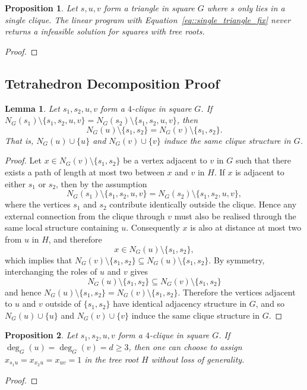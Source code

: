 \documentclass[11pt]{article}
\newtheorem{proposition}{Proposition}
\newtheorem{lemma}{Lemma}
\begin{document}
\begin{proposition} \label{prop::single_triangular_decomposition_feasibility}
  Let $s,u,v$ form a triangle in square $G$ where $s$ only lies in a single clique. The linear program with Equation~\eqref{eq::single_triangle_fix} never returns a infeasible solution for squares with tree roots. 
\end{proposition}
\begin{proof}
\end{proof}

\subsection{Tetrahedron Decomposition Proof} \label{subsec::TD_proof}
\begin{lemma} \label{lemma::tetrahedron_subset_neighbourhood}
  Let $s_1,s_2,u,v$ form a $4$-clique in square $G$. If $N_G(s_1)\setminus\{s_1,s_2,u,v\}=N_G(s_2)\setminus\{s_1,s_2,u,v\}$, then
  \[
  N_G(u)\setminus\{s_1, s_2\}=N_G(v)\setminus\{s_1, s_2\}.
  \]
  That is, $N_G(u)\cup\{u\}$ and $N_G(v)\cup\{v\}$ induce the same clique structure in $G$.
\end{lemma}
\begin{proof}
  Let $x \in N_G(v)\setminus\{s_1,s_2\}$ be a vertex adjacent to $v$ in $G$ such that there exists a path of length at most two between $x$ and $v$ in $H$. If $x$ is adjacent to either $s_1$ or $s_2$, then by the assumption
  \[
  N_G(s_1)\setminus\{s_1,s_2,u,v\}
  =
  N_G(s_2)\setminus\{s_1,s_2,u,v\},
  \]
  where the vertices $s_1$ and $s_2$ contribute identically outside the clique. Hence any external connection from the clique through $v$ must also be realised through the same local structure containing $u$. Consequently $x$ is also at distance at most two from $u$ in $H$, and therefore
  \[
  x\in N_G(u)\setminus\{s_1,s_2\},
  \]
  which implies that $N_G(v)\setminus\{s_1,s_2\} \subseteq N_G(u)\setminus\{s_1,s_2\}$. By symmetry, interchanging the roles of $u$ and $v$ gives
  \[
  N_G(u)\setminus\{s_1,s_2\} \subseteq N_G(v)\setminus\{s_1,s_2\} 
  \]
  and hence  $N_G(u)\setminus\{s_1,s_2\} = N_G(v)\setminus\{s_1,s_2\}$. Therefore the vertices adjacent to $u$ and $v$ outside of $\{s_1,s_2\}$ have identical adjacency structure in $G$, and so $N_G(u)\cup\{u\}$ and $N_G(v)\cup\{v\}$ induce the same clique structure in $G$.
\end{proof}

\begin{proposition} \label{prop::textrahedron_decomposition_equality}
  Let $s_1,s_2,u,v$ form a $4$-clique in square $G$. If $\deg_G(u)=\deg_G(v)=d\geq3$, then one can choose to assign $x_{s_1u}=x_{x_2u}=x_{uv}=1$ in the tree root $H$ without loss of generality.
\end{proposition}
\begin{proof}
  
\end{proof}
\end{document}
